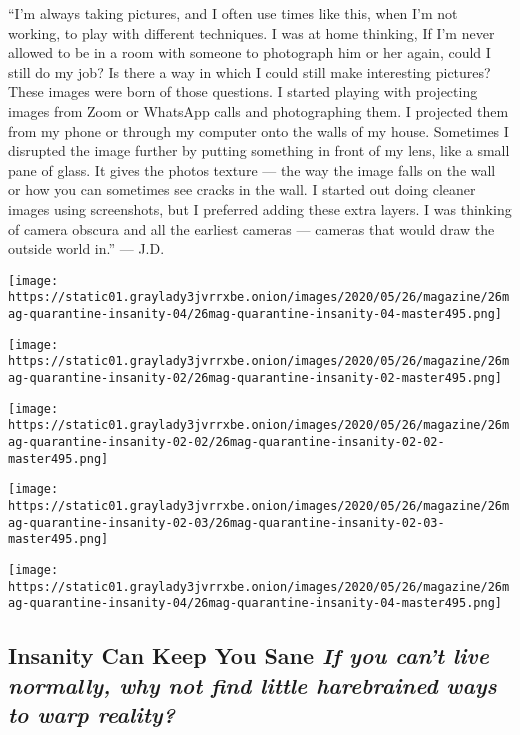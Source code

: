 ``I'm always taking pictures, and I often use times like this, when I'm
not working, to play with different techniques. I was at home thinking,
If I'm never allowed to be in a room with someone to photograph him or
her again, could I still do my job? Is there a way in which I could
still make interesting pictures? These images were born of those
questions. I started playing with projecting images from Zoom or
WhatsApp calls and photographing them. I projected them from my phone or
through my computer onto the walls of my house. Sometimes I disrupted
the image further by putting something in front of my lens, like a small
pane of glass. It gives the photos texture --- the way the image falls
on the wall or how you can sometimes see cracks in the wall. I started
out doing cleaner images using screenshots, but I preferred adding these
extra layers. I was thinking of camera obscura and all the earliest
cameras --- cameras that would draw the outside world in.'' --- J.D.

\texttt{[image: https://static01.graylady3jvrrxbe.onion/images/2020/05/26/magazine/26mag-quarantine-insanity-04/26mag-quarantine-insanity-04-master495.png]}

\texttt{[image: https://static01.graylady3jvrrxbe.onion/images/2020/05/26/magazine/26mag-quarantine-insanity-02/26mag-quarantine-insanity-02-master495.png]}

\texttt{[image: https://static01.graylady3jvrrxbe.onion/images/2020/05/26/magazine/26mag-quarantine-insanity-02-02/26mag-quarantine-insanity-02-02-master495.png]}

\texttt{[image: https://static01.graylady3jvrrxbe.onion/images/2020/05/26/magazine/26mag-quarantine-insanity-02-03/26mag-quarantine-insanity-02-03-master495.png]}

\texttt{[image: https://static01.graylady3jvrrxbe.onion/images/2020/05/26/magazine/26mag-quarantine-insanity-04/26mag-quarantine-insanity-04-master495.png]}

\hypertarget{insanity-can-keep-you-sane-if-you-cant-live-normally-why-not-find-little-harebrained-ways-to-warp-reality}{%
\subsection{\texorpdfstring{Insanity Can Keep You Sane \emph{If you
can't live normally, why not find little harebrained ways to warp
reality?}}{Insanity Can Keep You Sane If you can't live normally, why not find little harebrained ways to warp reality?}}\label{insanity-can-keep-you-sane-if-you-cant-live-normally-why-not-find-little-harebrained-ways-to-warp-reality}}

